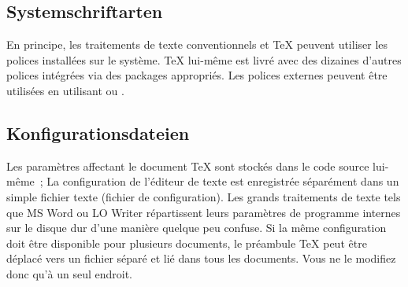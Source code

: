 \documentclass[11pt,a4paper,ngerman,french,DIV=8]{scrartcl}
\begin{document}
\subsection{Systemschriftarten}

En principe, les traitements de texte conventionnels et \TeX{} peuvent utiliser les polices installées sur le système. \TeX{} lui-même est livré avec des dizaines d'autres polices intégrées via des packages appropriés. Les polices externes peuvent être utilisées en utilisant \XeTeX{} ou \LuaTeX{}.

\subsection{Konfigurationsdateien}

Les paramètres affectant le document \TeX{} sont stockés dans le code source lui-même ; La configuration de l'éditeur de texte est enregistrée séparément dans un simple fichier texte (fichier de configuration). Les grands traitements de texte tels que MS Word ou LO Writer répartissent leurs paramètres de programme internes sur le disque dur d'une manière quelque peu confuse. Si la même configuration doit être disponible pour plusieurs documents, le préambule \TeX{} peut être déplacé vers un fichier séparé et lié dans tous les documents. Vous ne le modifiez donc qu’à un seul endroit.

\end{document}
